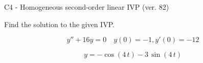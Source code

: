 \begin{exercise}
  \begin{exerciseTitle}C4 - Homogeneous second-order linear IVP (ver. 82)\end{exerciseTitle}
  \begin{exerciseStatement}
    
Find the solution to the given IVP.

    
\[y''+16y = 0 \hspace{1em} y(0) = -1 , y'(0) = -12\]

  \end{exerciseStatement}
  \begin{exerciseAnswer}
    
\[y= -\cos\left(4 \, t\right) - 3 \, \sin\left(4 \, t\right)\]

  \end{exerciseAnswer}
\end{exercise}